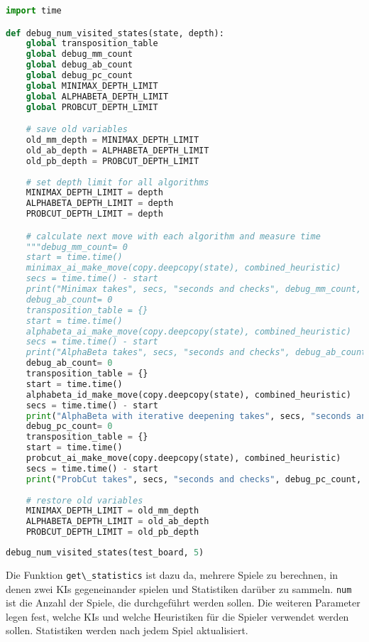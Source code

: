 \begin{lstlisting}[language=Python]
import time

def debug_num_visited_states(state, depth):
    global transposition_table
    global debug_mm_count
    global debug_ab_count
    global debug_pc_count
    global MINIMAX_DEPTH_LIMIT
    global ALPHABETA_DEPTH_LIMIT
    global PROBCUT_DEPTH_LIMIT

    # save old variables
    old_mm_depth = MINIMAX_DEPTH_LIMIT
    old_ab_depth = ALPHABETA_DEPTH_LIMIT
    old_pb_depth = PROBCUT_DEPTH_LIMIT
    
    # set depth limit for all algorithms
    MINIMAX_DEPTH_LIMIT = depth
    ALPHABETA_DEPTH_LIMIT = depth
    PROBCUT_DEPTH_LIMIT = depth

    # calculate next move with each algorithm and measure time
    """debug_mm_count= 0
    start = time.time()
    minimax_ai_make_move(copy.deepcopy(state), combined_heuristic)
    secs = time.time() - start
    print("Minimax takes", secs, "seconds and checks", debug_mm_count, "substates")
    debug_ab_count= 0
    transposition_table = {}
    start = time.time()
    alphabeta_ai_make_move(copy.deepcopy(state), combined_heuristic)
    secs = time.time() - start
    print("AlphaBeta takes", secs, "seconds and checks", debug_ab_count, "substates")"""
    debug_ab_count= 0
    transposition_table = {}
    start = time.time()
    alphabeta_id_make_move(copy.deepcopy(state), combined_heuristic)
    secs = time.time() - start
    print("AlphaBeta with iterative deepening takes", secs, "seconds and checks", debug_ab_count, "substates")
    debug_pc_count= 0
    transposition_table = {}
    start = time.time()
    probcut_ai_make_move(copy.deepcopy(state), combined_heuristic)
    secs = time.time() - start
    print("ProbCut takes", secs, "seconds and checks", debug_pc_count, "substates")
    
    # restore old variables
    MINIMAX_DEPTH_LIMIT = old_mm_depth
    ALPHABETA_DEPTH_LIMIT = old_ab_depth
    PROBCUT_DEPTH_LIMIT = old_pb_depth
\end{lstlisting}

\begin{lstlisting}[language=Python]
debug_num_visited_states(test_board, 5)
\end{lstlisting}

Die Funktion \passthrough{\lstinline!get\_statistics!} ist dazu da,
mehrere Spiele zu berechnen, in denen zwei KIs gegeneinander spielen und
Statistiken darüber zu sammeln. \passthrough{\lstinline!num!} ist die
Anzahl der Spiele, die durchgeführt werden sollen. Die weiteren
Parameter legen fest, welche KIs und welche Heuristiken für die Spieler
verwendet werden sollen. Statistiken werden nach jedem Spiel
aktualisiert.


